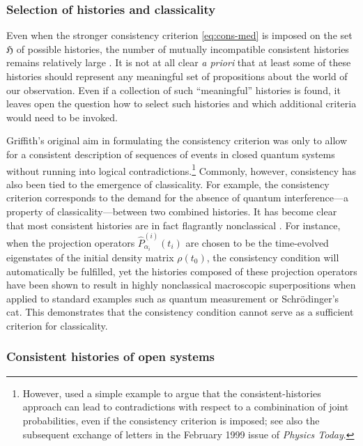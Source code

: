 \documentclass[rmp,aps,amsmath,amsfonts,noshowkeys,noshowpacs,12pt]{revtex4}
\begin{document}
\subsubsection{Selection of histories and classicality}

Even when the stronger consistency criterion \eqref{eq:cons-med} is
imposed on the set $\mathfrak{H}$ of possible histories, the number of
mutually incompatible consistent histories remains relatively large
\citep{Espagnat:1989:fl,Dowker:1996:ch}. It is not at all clear
\emph{a priori} that at least some of these histories should represent
any meaningful set of propositions about the world of our observation.
Even if a collection of such ``meaningful'' histories is found, it
leaves open the question how to select such histories and which
additional criteria would need to be invoked.

Griffith's \citeyearpar{Griffiths:1984:tr} original aim in formulating
the consistency criterion was only to allow for a consistent
description of sequences of events in closed quantum systems without
running into logical contradictions.\footnote{However,
  \citet{Goldstein:1998:yu} used a simple example to argue that the
  consistent-histories approach can lead to contradictions with
  respect to a combinination of joint probabilities, even if the
  consistency criterion is imposed; see also the subsequent exchange
  of letters in the February 1999 issue of {\em Physics Today}.}
Commonly, however, consistency has also been tied to the emergence of
classicality. For example, the consistency criterion corresponds to
the demand for the absence of quantum interference---a property of
classicality---between two combined histories.  It has become clear
that most consistent histories are in fact flagrantly nonclassical
\citep{GellMann:1990:uz,GellMann:1991:pp,Zurek:1993:pu,Paz:1993:ww,%
  Albrecht:1993:pq,Dowker:1995:pa,Dowker:1996:ch}.  For instance, when
the projection operators $\widehat{P}^{(i)}_{\alpha_i}(t_i)$ are
chosen to be the time-evolved eigenstates of the initial density
matrix $\rho(t_0)$, the consistency condition will automatically be
fulfilled, yet the histories composed of these projection operators
have been shown to result in highly nonclassical macroscopic
superpositions when applied to standard examples such as quantum
measurement or Schr\"odinger's cat. This demonstrates that the
consistency condition cannot serve as a sufficient criterion for
classicality.


\subsubsection{Consistent histories of open systems}
\end{document}
